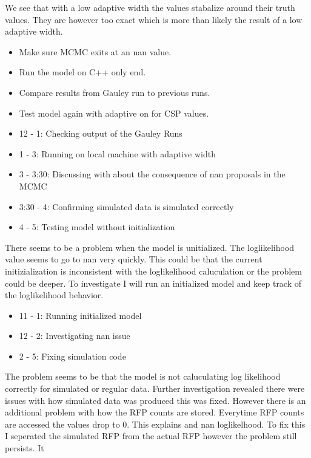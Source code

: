 \documentclass[12pt,hyperref]{labbook}
\begin{document}
We see that with a low adaptive width the values stabalize around their truth values. They are however too exact which
is more than likely the result of a low adaptive width.
\begin{itemize}
    \item Make sure MCMC exits at an nan value.
    \item Run the model on C++ only end.
    \item Compare results from Gauley run to previous runs.
    \item Test model again with adaptive on for CSP values.
\end{itemize}
\begin{itemize}
    \item 12 - 1: Checking output of the Gauley Runs
    \item 1 - 3: Running on local machine with adaptive width
    \item 3 - 3:30: Discussing with about the consequence of nan proposals in the MCMC
    \item 3:30 - 4: Confirming simulated data is simulated correctly
    \item 4 - 5: Testing model without initialization
\end{itemize}
There seems to be a problem when the model is unitialized. The loglikelihood value seems to go to nan very quickly.
This could be that the current initizialization is inconsistent with the loglikelihood caluculation or the problem could
be deeper. To investigate I will run an initialized model and keep track of the loglikelihood behavior.
\begin{itemize}
 \item 11 - 1: Running initialized model
 \item 12 - 2: Investigating nan issue
 \item 2 - 5: Fixing simulation code
\end{itemize}
The problem seems to be that the model is not caluculating log likelihood correctly for simulated or regular data.
Further investigation revealed there were issues with how simulated data was produced this was fixed. However there is an 
additional problem with how the RFP counts are stored. Everytime RFP counts are accessed the values drop to 0. This explains
and nan loglikelhood. To fix this I seperated the simulated RFP from the actual RFP however the problem still persists. It 
\end{document}

